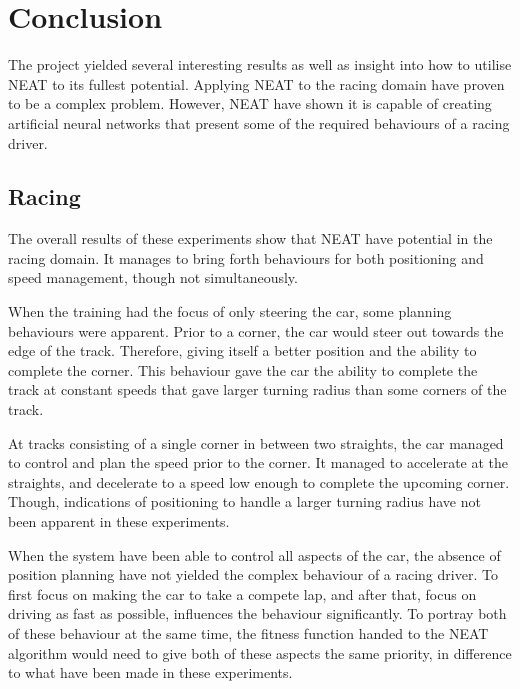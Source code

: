 \chapter{Conclusion}
\label{conclusion}
The project yielded several interesting results as well as insight into how to utilise NEAT to its fullest potential. Applying NEAT to the racing domain have proven to be a complex problem. However, NEAT have shown it is capable of creating artificial neural networks that present some of the required behaviours of a racing driver.


\section{Racing}
\label{conclusion_racing}
The overall results of these experiments show that NEAT have potential in the racing domain. It manages to bring forth behaviours for both positioning and speed management, though not simultaneously. 

When the training had the focus of only steering the car, some planning behaviours were apparent. Prior to a corner, the car would steer out towards the edge of the track. Therefore, giving itself a better position and the ability to complete the corner. This behaviour gave the car the ability to complete the track at constant speeds that gave larger turning radius than some corners of the track.

At tracks consisting of a single corner in between two straights, the car managed to control and plan the speed prior to the corner. It managed to accelerate at the straights, and decelerate to a speed low enough to complete the upcoming corner. Though, indications of positioning to handle a larger turning radius have not been apparent in these experiments.

When the system have been able to control all aspects of the car, the absence of position planning have not yielded the complex behaviour of a racing driver. To first focus on making the car to take a compete lap, and after that, focus on driving as fast as possible, influences the behaviour significantly. To portray both of these behaviour at the same time, the fitness function handed to the NEAT algorithm would need to give both of these aspects the same priority, in difference to what have been made in these experiments.


